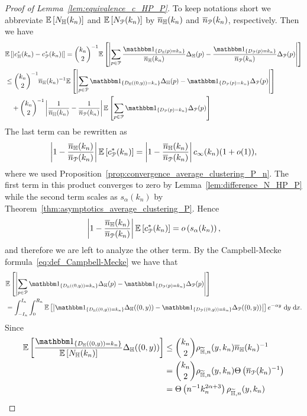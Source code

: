 \begin{proof}[Proof of Lemma~\ref{lem:equivalence_c_HP_P}] 
To keep notations short we abbreviate $\mathbb{E}\left[N_{\mathbb{H}} (k_n)\right]$ and $\mathbb{E}\left[N_{{\mathcal P}} (k_n)\right]$ by $\overline{n}_{\mathbb{H}}(k_n)$ and $\overline{n}_{{\mathcal P}}(k_n)$, respectively.
Then we have
\begin{align*} 
	&\Exp{\left|  c_{\H}^\ast(k_n) - c_\Pcal^\ast(k_n)\right|}= 
	\binom{k_n}{2}^{-1}\Exp{\left|\sum_{p \in \Pcal} 
    	\frac{\ind{D_\H(p) = k_n}}{\expH} \Delta_\H(p )
        - \frac{\ind{D_\Pcal(p) = k_n}}{\expP}  \Delta_\Pcal(p)\right|} \\
    &\le\binom{k_n}{2}^{-1} \expH^{-1} \Exp{\left|\sum_{p \in \Pcal} \ind{D_\H((0,y)) = k_n} \Delta_\H(p) 
    	- \ind{D_\Pcal(p) = k_n} \Delta_\Pcal(p)\right|} \\
    &\hspace{10pt}+ \binom{k_n}{2}^{-1} \left|\frac{1}{\expH} - \frac{1}{\expP}\right|\Exp{
        	\sum_{p \in \Pcal} \ind{D_\Pcal(p) = k_n} \Delta_\Pcal(p) }
\end{align*}
The last term can be rewritten as
\begin{align*}
	\left|1 - \frac{\overline{n}_{\mathbb{H}}(k_n)}{\overline{n}_{{\mathcal P}}(k_n)}\right| \mathbb{E}\left[c_{{\mathcal P}}^\ast(k_n)\right] = \left|1 - \frac{\overline{n}_{\mathbb{H}}(k_n)}{\overline{n}_{{\mathcal P}}(k_n)}\right|c_\infty(k_n)(1+o(1)),
\end{align*}
where we used Proposition~\ref{prop:convergence_average_clustering_P_n}. The first term in this product converges to zero by Lemma~\ref{lem:difference_N_HP_P} while the second term scales as $s_\alpha(k_n)$ by Theorem~\ref{thm:asymptotics_average_clustering_P}. Hence
\[
	\left|1 - \frac{\overline{n}_{\mathbb{H}}(k_n)}{\overline{n}_{{\mathcal P}}(k_n)}\right| \mathbb{E}\left[c_{{\mathcal P}}^\ast(k_n)\right] = o\left(s_\alpha(k_n)\right),
\]
and therefore we are left to analyze the other term. By the Campbell-Mecke formula~\eqref{eq:def_Campbell-Mecke} we have that
\begin{align*}
	    &\Exp{\left|\sum_{p \in \Pcal} \ind{D_\H((0,y)) = k_n} \Delta_\H(p) 
	        	- \ind{D_\Pcal(p) = k_n} \Delta_\Pcal(p)\right|} \\
	    &= \int_{-I_n}^{I_n} \int_0^{R_n} 
	        \Exp{\left|\ind{D_\H((0,y)) = k_n} \Delta_\H ((0,y) ) - \ind{D_\Pcal((0,y)) = k_n} \Delta_\Pcal ((0,y))\right|} 
	        	e^{-\alpha y} \dd y \dd x.
\end{align*}
Since 
\begin{align*}
	\Exp{\frac{\ind{D_\H((0,y)) = k_n}}{\Exp{N_\H(k_n)}} \Delta_\H ((0,y) )}
	&\le \binom{k_n}{2} \rho_{\HP,n}(y,k_n)\expH^{-1} \\
	&= \binom{k_n}{2} \rho_{\HP,n}(y,k_n)\bigT{\expP^{-1}}\\
	&= \bigT{n^{-1} k_n^{2\alpha + 3}}\rho_{\HP,n}(y,k_n)

\end{align*}
\end{proof}
